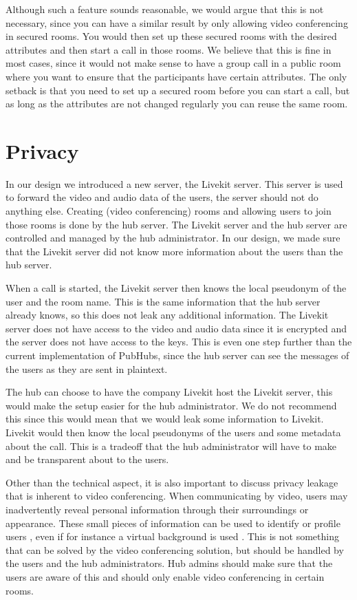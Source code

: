 \documentclass{report}
\begin{document}
Although such a feature sounds reasonable, we would argue that this is not necessary, since you can have a similar
result by only allowing video conferencing in secured rooms. You would then set up these secured rooms with the
desired attributes and then start a call in those rooms. We believe that this is fine in most cases, since it would
not make sense to have a group call in a public room where you want to ensure that the participants have certain attributes.
The only setback is that you need to set up a secured room before you can start a call, but as long as the attributes
are not changed regularly you can reuse the same room.

\section{Privacy}
In our design we introduced a new server, the Livekit server. This server is used to forward the video and audio data
of the users, the server should not do anything else. Creating (video conferencing) rooms and allowing users to join
those rooms is done by the hub server. The Livekit server and the hub server are controlled and managed by the hub
administrator. In our design, we made sure that the Livekit server did not know more information about the users
than the hub server.

When a call is started, the Livekit server then knows the local pseudonym of the user and the room name. This is the
same information that the hub server already knows, so this does not leak any additional information. The Livekit server
does not have access to the video and audio data since it is encrypted and the server does not have access to the keys.
This is even one step further than the current implementation of PubHubs, since the hub server can see the messages of
the users as they are sent in plaintext.

The hub can choose to have the company Livekit host the Livekit server, this would make the setup easier for the hub
administrator. We do not recommend this since this would mean that we would leak some information to Livekit.
Livekit would then know the local pseudonyms of the users and some metadata about the call. This is a tradeoff that
the hub administrator will have to make and be transparent about to the users.

Other than the technical aspect, it is also important to discuss privacy leakage that is inherent to video conferencing.
When communicating by video, users may inadvertently reveal personal information through their surroundings or
appearance. These small pieces of information can be used to identify or profile users \cite{kagan_zooming_2024},
even if for instance a virtual background is used \cite{hilgefort_spying_2021}. This is not something that can be solved by the video conferencing solution, but
should be handled by the users and the hub administrators. Hub admins should make sure that the users are aware of
this and should only enable video conferencing in certain rooms.
\end{document}
